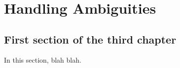 \chapter{Handling Ambiguities}

\ifpdf
    \graphicspath{{Chapter5/Figs/Raster/}{Chapter5/Figs/PDF/}{Chapter5/Figs/}}
\else
    \graphicspath{{Chapter5/Figs/Vector/}{Chapter5/Figs/}}
\fi

\section{First section of the third chapter}
In this section, blah blah.